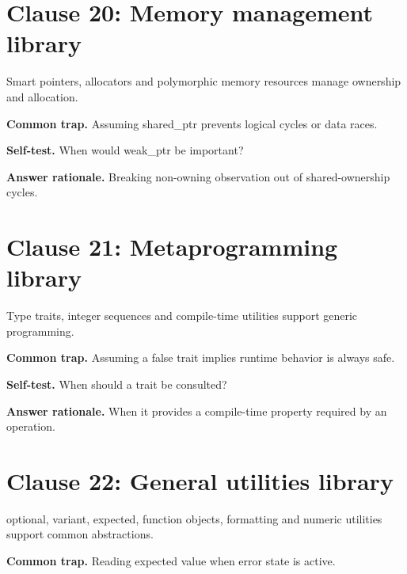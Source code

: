 \documentclass[11pt]{article}
\begin{document}
\section{Clause 20: Memory management library}
Smart pointers, allocators and polymorphic memory resources manage ownership and allocation.

\textbf{Common trap.} Assuming shared\_ptr prevents logical cycles or data races.

\textbf{Self-test.} When would weak\_ptr be important?

\textbf{Answer rationale.} Breaking non-owning observation out of shared-ownership cycles.

\section{Clause 21: Metaprogramming library}
Type traits, integer sequences and compile-time utilities support generic programming.

\textbf{Common trap.} Assuming a false trait implies runtime behavior is always safe.

\textbf{Self-test.} When should a trait be consulted?

\textbf{Answer rationale.} When it provides a compile-time property required by an operation.

\section{Clause 22: General utilities library}
optional, variant, expected, function objects, formatting and numeric utilities support common abstractions.

\textbf{Common trap.} Reading expected value when error state is active.
\end{document}
